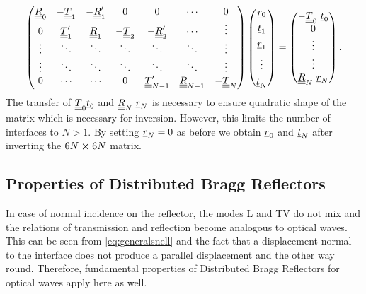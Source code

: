 \begin{equation}
    \begin{pmatrix}
        \underline{\underline{R}}_0         & -\underline{\underline{T}}_1           & -\underline{\underline{R}}_1^\prime &
        0
                             & 0                       & \cdots               &
        0
        \\
        0                    & \underline{\underline{T}}_1^\prime     & \underline{\underline{R}}_1         &
        -\underline{\underline{T}}_2        &
        -\underline{\underline{R}}_2^\prime & \cdots                  & \vdots
        \\
        \vdots               & \ddots                  & \ddots               &
        \ddots               & \ddots                  & \ddots               &
        \vdots
        \\
        \vdots               & \ddots                  & \ddots               &
        \ddots               & \ddots                  & \ddots               &
        \vdots
        \\
        0                    & \cdots                  & \cdots               &
        0
                             & \underline{\underline{T}}_{N-1}^\prime & \underline{\underline{R}}_{N-1}
                             &
        -\underline{\underline{T}}_{N}

    \end{pmatrix}
    \begin{pmatrix}
        \underline{r_0} \\[4pt] \underline{t}_1 \\[4pt] \underline{r}_1 \\[4pt] \vdots
        \\[4pt] \underline{t}_{N}
    \end{pmatrix}
    =
    \begin{pmatrix}
        -\underline{\underline{T}}_0\ \underline{t}_0 \\ 0 \\ \vdots \\ \vdots \\ \underline{\underline{R}}_{N}\
        \underline{r}_N
    \end{pmatrix}.
\end{equation}
The transfer of $\underline{\underline{T}}_0\underline{t}_0$ and $\underline{\underline{R}}_{N}\ \underline{r}_N$
is necessary to ensure quadratic shape of the matrix which is necessary for
inversion. However, this limits the number of interfaces to $N > 1$.
By setting $\underline{r}_N = 0$ as before we obtain
$\underline{r}_0$ and $\underline{t}_N$ after inverting the $6N\cross 6N$ matrix.

\subsection{Properties of Distributed Bragg Reflectors} \label{sec:bragg}
In case of normal incidence on the reflector, the modes L and TV do not mix
and the relations of transmission and reflection become analogous to optical
waves. This can be seen from \ref{eq:generalsnell} and the fact that a
displacement normal to the interface does not produce a parallel displacement
and the other way round.
Therefore, fundamental properties of Distributed Bragg Reflectors for optical
waves apply here as well.


